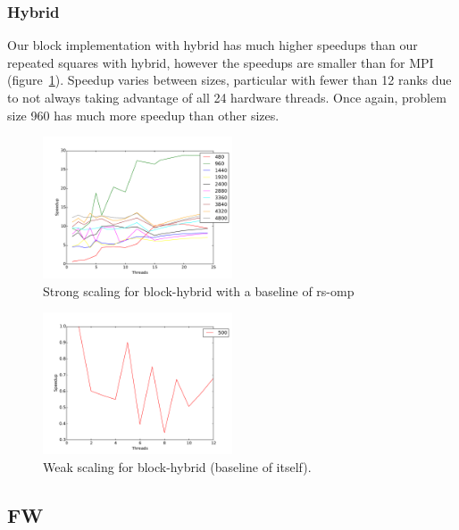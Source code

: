 \subsubsection{Hybrid}

Our block implementation with hybrid has much higher speedups than our repeated
squares with hybrid, however the speedups are smaller than for MPI
(figure~\ref{strong-block-hybrid}). Speedup varies between sizes, particular
with fewer than 12 ranks due to not always taking advantage of all 24 hardware
threads. Once again, problem size 960 has much more speedup than other sizes.

\begin{figure}[ht]
\centering
\includegraphics[width=0.5\textwidth]{plots/strong_block-hybrid_baseline-rs-omp--1.pdf}
\caption{Strong scaling for block-hybrid with a baseline of rs-omp}
\label{strong-block-hybrid}
\end{figure}


\begin{figure}[ht]
\centering
\includegraphics[width=0.5\textwidth]{plots/weak_block-hybrid.pdf}
\caption{Weak scaling for block-hybrid (baseline of itself).}
\label{weak-block-hybrid}
\end{figure}

\subsection{FW}

